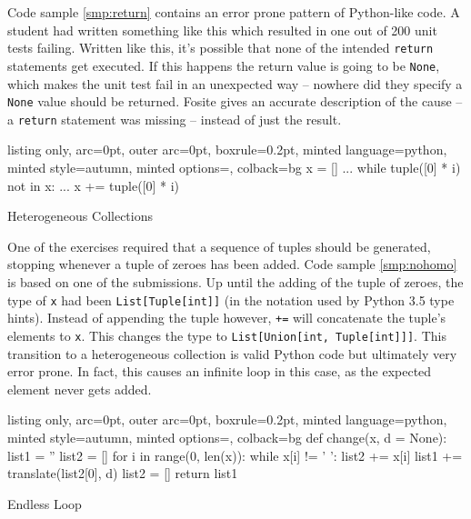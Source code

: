 \documentclass[]{article}
\begin{document}
Code sample \ref{smp:return} contains an error prone pattern of
Python-like code. A student had written something like this which
resulted in one out of 200 unit tests failing. Written like this, it's
possible that none of the intended \texttt{return} statements get
executed. If this happens the return value is going to be \texttt{None},
which makes the unit test fail in an unexpected way -- nowhere did they
specify a \texttt{None} value should be returned. Fosite gives an
accurate description of the cause -- a \texttt{return} statement was
missing -- instead of just the result.

\begin{code}
  \begin{tcblisting}{listing only, 
  arc=0pt,
  outer arc=0pt, 
  boxrule=0.2pt,
  minted language=python,
  minted style=autumn,
  minted options={},
  colback=bg }
x = []
...
while tuple([0] * i) not in x:
    ...
    x += tuple([0] * i)
\end{tcblisting}
\caption{Heterogeneous Collections} \label{smp:nohomo}
\end{code}

One of the exercises required that a sequence of tuples should be
generated, stopping whenever a tuple of zeroes has been added. Code
sample \ref{smp:nohomo} is based on one of the submissions. Up until the
adding of the tuple of zeroes, the type of \texttt{x} had been
\texttt{List{[}Tuple{[}int{]}{]}} (in the notation used by Python 3.5
type hints). Instead of appending the tuple however, \texttt{+=} will
concatenate the tuple's elements to \texttt{x}. This changes the type to
\texttt{List{[}Union{[}int,\ Tuple{[}int{]}{]}{]}}. This transition to a
heterogeneous collection is valid Python code but ultimately very error
prone. In fact, this causes an infinite loop in this case, as the
expected element never gets added.

\begin{code}
  \begin{tcblisting}{listing only, 
  arc=0pt,
  outer arc=0pt, 
  boxrule=0.2pt,
  minted language=python,
  minted style=autumn,
  minted options={},
  colback=bg }
def change(x, d = None):
  list1 = ''
  list2 = []
  for i in range(0, len(x)):
    while x[i] != ' ':
      list2 += x[i]
    list1 += translate(list2[0], d)
    list2 = []
  return list1
\end{tcblisting}
\caption{Endless Loop} \label{smp:nostop}
\end{code}
\end{document}
